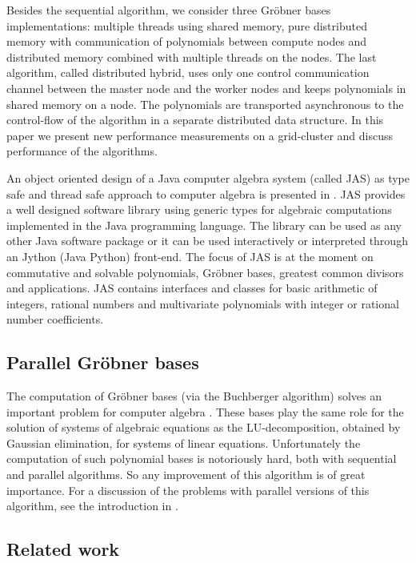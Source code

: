 \documentclass[10pt,twocolumn,a4paper]{article}
\begin{document}
Besides the sequential algorithm, we consider three Gr\"obner bases implementations: multiple threads using shared memory,
pure distributed memory with communication of polynomials between
compute nodes and distributed memory combined with multiple threads on
the nodes. The last algorithm, called distributed hybrid, uses only
one control communication channel between the master node and the
worker nodes and keeps polynomials in shared memory on a node.  The
polynomials are transported asynchronous to the control-flow of the
algorithm in a separate distributed data structure.  In this paper we
present new performance measurements on a grid-cluster
\cite{bwgrid:2008} and discuss performance of the algorithms.

An object oriented design of a Java computer algebra system (called
JAS) as type safe and thread safe approach to computer algebra is
presented in \cite{Kredel:2000,Kredel:2006,Kredel:2007,Kredel:2008b}.
JAS provides a well designed software library using generic types for
algebraic computations implemented in the Java programming language.
The library can be used as any other Java software package or it can
be used interactively or interpreted through an Jython (Java Python)
front-end. The focus of JAS is at the moment on commutative and
solvable polynomials, Gr\"obner bases, greatest common divisors and
applications.  JAS contains interfaces and classes for basic
arithmetic of integers, rational numbers and multivariate polynomials
with integer or rational number coefficients.


\subsection{Parallel Gr\"obner bases} 

The computation of Gr\"obner bases (via the Buchberger algorithm)
solves an important problem for computer algebra \cite{Becker:1993}.
These bases play the same role for the solution of systems of
algebraic equations as the LU-de\-compo\-sit\-ion, obtained by
Gaussian elimination, for systems of linear equations.  Unfortunately
the computation of such polynomial bases is notoriously hard, both
with sequential and parallel algorithms.  So any improvement of this
algorithm is of great importance.  For a discussion of the problems
with parallel versions of this algorithm, see the introduction in
\cite{Kredel:2009}.


\subsection{Related work} \label{sec:rela}
\end{document}
